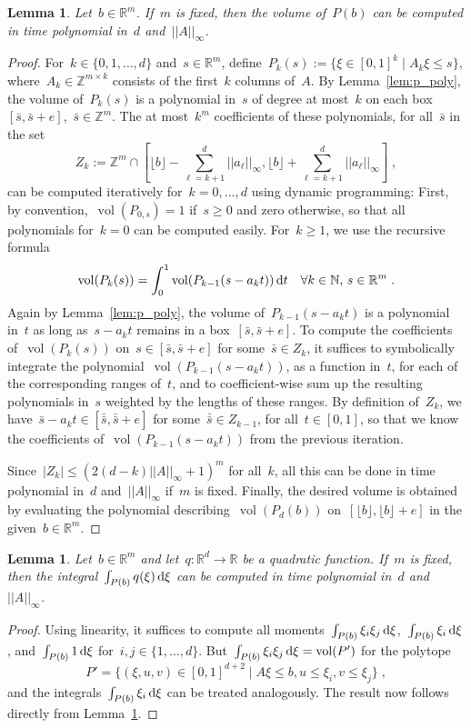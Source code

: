\documentclass{article}
\newtheorem{lemma}[theorem]{Lemma}
\newcommand{\N}{\mathbb{N}}
\newcommand{\Z}{\mathbb{Z}}
\newcommand{\R}{\mathbb{R}}
\renewcommand{\d}{\,\textnormal{d}}
\DeclareMathOperator{\vol}{vol}
\begin{document}
\begin{lemma}\label{lem:pseudo_vol}
  Let~$b\in\R^m$. If~$m$ is fixed, then the volume of~$P(b)$ can be
  computed in time polynomial in~$d$ and~$||A||_\infty$.
\end{lemma}
\begin{proof}
  For~$k\in\{0,1,\dots,d\}$ and~$s\in\R^m$,
  define~$P_{k}(s):=\{\xi\in[0,1]^k\mid A_k\xi\le s\}$,
  where~$A_k\in\Z^{m\times k}$ consists of the first~$k$ columns
  of~$A$. By Lemma~\ref{lem:p_poly}, the volume of~$P_{k}(s)$ is a
  polynomial in~$s$ of degree at most~$k$ on each box~$[\bar s,\bar
    s+e]$,~$\bar s\in\Z^m$. The at most~$k^m$ coefficients of these
  polynomials, for all~$\bar s$ in the set
  \[
  \textstyle Z_k:=\Z^m\cap [\lfloor
    b\rfloor-\sum_{\ell=k+1}^d||a_\ell||_\infty,\lfloor
    b\rfloor+\sum_{\ell=k+1}^d||a_\ell||_\infty]\;,
  \]  
  can be computed iteratively for~$k=0,\dots,d$ using dynamic
  programming: First, by convention,~$\vol(P_{0,s})=1$ if~$s\ge 0$ and
  zero otherwise, so that all polynomials for~$k=0$ can be computed
  easily. For~$k\ge 1$, we use the recursive formula
  \[
    \vol(P_{k}(s))=\int_0^1\vol(P_{k-1}(s-a_kt))\d t\quad\forall
    k\in\N,\,s\in\R^m\;.
  \]
  Again by Lemma~\ref{lem:p_poly}, the volume of~$P_{k-1}(s-a_kt)$ is
  a polynomial in~$t$ as long as~$s-a_kt$ remains in a box~$[\bar
    s,\bar s+e]$. To compute the coefficients of~$\vol(P_{k}(s))$
  on~$s\in[\bar s,\bar s+e]$ for some~$\bar s\in Z_k$, it suffices to
  symbolically integrate the polynomial~$\vol(P_{k-1}(s-a_kt))$, as a
  function in~$t$, for each of the corresponding ranges of~$t$, and to
  coefficient-wise sum up the resulting polynomials in~$s$ weighted by
  the lengths of these ranges. By definition of~$Z_k$, we have~$\bar
  s-a_kt\in[\bar{\bar s},\bar{\bar s}+e]$ for some~$\bar{\bar s}\in
  Z_{k-1}$, for all~$t\in[0,1]$, so that we know the coefficients
  of~$\vol(P_{k-1}(s-a_kt))$ from the previous iteration.

  Since~$|Z_k|\le (2(d-k)||A||_\infty+1)^m$ for all~$k$, all this can
  be done in time polynomial in~$d$ and~$||A||_\infty$ if~$m$ is
  fixed. Finally, the desired volume is obtained by evaluating the
  polynomial describing~$\vol(P_{d}(b))$ on~$[\lfloor b\rfloor,\lfloor
    b\rfloor+e]$ in the given~$b\in\R^m$.
\end{proof}

\begin{lemma}\label{lem:quad}
  Let~$b\in\R^m$ and let~$q\colon\R^d\to\R$ be a quadratic
  function. If~$m$ is fixed, then the integral~$\int_{P(b)}
  q(\xi)\d\xi$ can be computed in time polynomial in~$d$
  and~$||A||_\infty$.
\end{lemma}
\begin{proof}
  Using linearity, it suffices to compute all moments~$\int_{P(b)}
  \xi_i\xi_j\d\xi$,~$\int_{P(b)} \xi_i\d\xi$, and~$\int_{P(b)} 1\d\xi$
  for~$i,j\in\{1,\dots,d\}$. But~$\int_{P(b)}
  \xi_i\xi_j\d\xi=\vol(P')$ for the polytope
  \[
  P'=\{(\xi,u,v)\in [0,1]^{d+2}\mid A\xi\le b,u\le\xi_i,v\le\xi_j\}\;,
  \]
  and the integrals~$\int_{P(b)} \xi_i\d\xi$ can be treated analogously.
  The result now follows directly from Lemma~\ref{lem:pseudo_vol}.
\end{proof}
\end{document}
